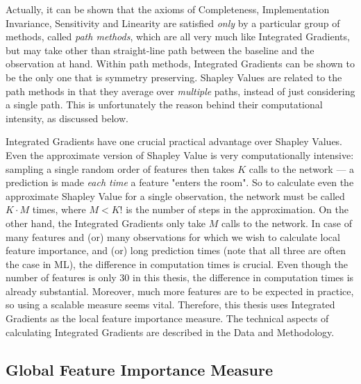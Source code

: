 			Actually, it can be shown \citep{sundararajan2017axiomatic} that the axioms of Completeness, Implementation Invariance, Sensitivity and Linearity are satisfied \textit{only} by a particular group of methods, called \textit{path methods}, which are all very much like Integrated Gradients, but may take other than straight-line path between the baseline and the observation at hand. Within path methods, Integrated Gradients can be shown \citep{sundararajan2017axiomatic} to be the only one that is symmetry preserving. Shapley Values are related to the path methods in that they average over \textit{multiple} paths, instead of just considering a single path. This is unfortunately the reason behind their computational intensity, as discussed below.  
			
			Integrated Gradients have one crucial practical advantage over Shapley Values. Even the approximate version of Shapley Value \citep{vstrumbelj2014explaining} is very computationally intensive: sampling a single random order of features then takes $K$ calls to the network --- a prediction is made \textit{each time} a feature "enters the room". So to calculate even the approximate Shapley Value for a single observation, the network must be called $K\cdot M$ times, where $M < K!$ is the number of steps in the approximation. On the other hand, the Integrated Gradients only take $M$ calls to the network. In case of many features and (or) many observations for which we wish to calculate local feature importance, and (or) long prediction times (note that all three are often the case in ML), the difference in computation times is crucial. Even though the number of features is only 30 in this thesis, the difference in computation times is already substantial. Moreover, much more features are to be expected in practice, so using a scalable measure seems vital. Therefore, this thesis uses Integrated Gradients as the local feature importance measure. The technical aspects of calculating Integrated Gradients are described in the Data and Methodology. 
		
		
		\subsection{Global Feature Importance Measure} 
		
